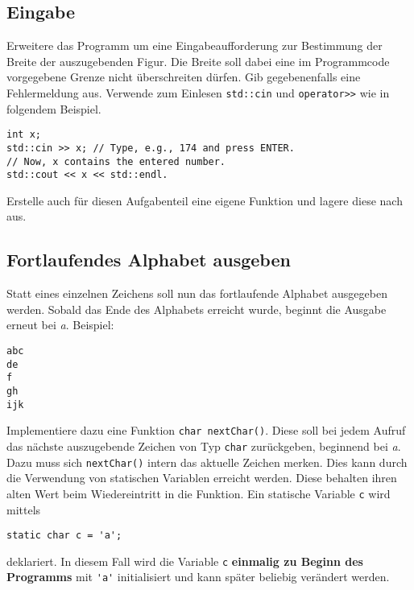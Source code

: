 \subsection{Eingabe}
Erweitere das Programm um eine Eingabeaufforderung zur Bestimmung der Breite der auszugebenden Figur.
Die Breite soll dabei eine im Programmcode vorgegebene Grenze nicht überschreiten dürfen.
Gib gegebenenfalls eine Fehlermeldung aus.
Verwende zum Einlesen \lstinline{std::cin} und \lstinline{operator>>} wie in folgendem Beispiel.

\begin{lstlisting}
int x;
std::cin >> x; // Type, e.g., 174 and press ENTER.
// Now, x contains the entered number.
std::cout << x << std::endl.
\end{lstlisting}

Erstelle auch für diesen Aufgabenteil eine eigene Funktion und lagere diese nach  aus.

\subsection{Fortlaufendes Alphabet ausgeben}
Statt eines einzelnen Zeichens soll nun das fortlaufende Alphabet ausgegeben werden.
Sobald das Ende des Alphabets erreicht wurde, beginnt die Ausgabe erneut bei \emph{a}.
Beispiel:

\begin{lstlisting}
abc
de
f
gh
ijk
\end{lstlisting}

Implementiere dazu eine Funktion \lstinline{char nextChar()}.
Diese soll bei jedem Aufruf das nächste auszugebende Zeichen von Typ \lstinline{char} zurückgeben, beginnend bei \emph{a}.
Dazu muss sich \lstinline{nextChar()} intern das aktuelle Zeichen merken.
Dies kann durch die Verwendung von statischen Variablen erreicht werden. Diese behalten ihren alten Wert beim Wiedereintritt in die Funktion.
Ein statische Variable \lstinline{c} wird mittels

\begin{lstlisting}
static char c = 'a';
\end{lstlisting}

deklariert.
In diesem Fall wird die Variable \lstinline{c} \textbf{einmalig zu Beginn des Programms} mit \lstinline{'a'} initialisiert und kann später beliebig verändert werden.


